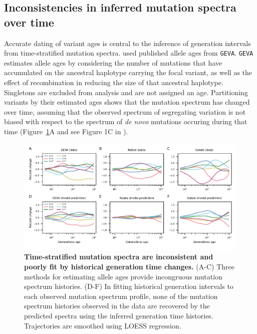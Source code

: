 \documentclass[]{article}
\newcommand{\GEVA}{\texttt{GEVA}\xspace}
\begin{document}
\subsection*{Inconsistencies in inferred mutation spectra over time}

Accurate dating of variant ages is central to the inference of generation
intervals from time-stratified mutation spectra. \citet{wang2023human} used
published allele ages from \GEVA \citep{albers2020dating}. \GEVA estimates
allele ages by considering the number of mutations that have accumulated on the
ancestral haplotype carrying the focal variant, as well as the effect of
recombination in reducing the size of that ancestral haplotype. Singletons are
excluded from analysis and are not assigned an age. Partitioning variants by
their estimated ages shows that the mutation spectrum has changed over time,
assuming that the observed spectrum of segregating variation is not biased with
respect to the spectrum of \emph{de novo} mutations occuring during that time
(Figure~\ref{fig:spectrum-ages}A and see Figure 1C in \citet{wang2023human}).

\begin{figure}[tb!]
    \centering
    \includegraphics{../plots/fig1.pdf}
    \caption{
        \textbf{Time-stratified mutation spectra are inconsistent and poorly
        fit by historical generation time changes.} (A-C) Three methods for
        estimating allele ages provide incongruous mutation spectrum histories.
        (D-F) In fitting historical generation intervals to each observed
        mutation spectrum profile, none of the mutation spectrum histories
        observed in the data are recovered by the predicted spectra using the
        inferred generation time histories. Trajectories are smoothed using
        LOESS regression.
    }
    \label{fig:spectrum-ages}
\end{figure}
\end{document}

